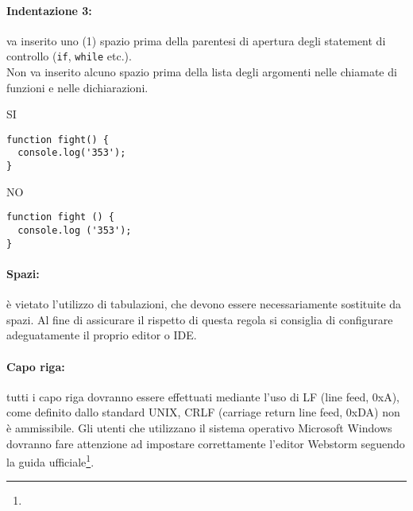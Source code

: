 \documentclass[../ProcessiPrimari.tex]{subfiles}
\begin{document}
\paragraph*{Indentazione 3: }
va inserito uno (1) spazio prima della parentesi di apertura degli statement di controllo (\texttt{if}, \texttt{while} etc.). \\
Non va inserito alcuno spazio prima della lista degli argomenti nelle chiamate di funzioni e nelle dichiarazioni.\\

\begin{center}{
\begin{minipage}{5cm}
{\begin{center}SI\end{center}}
\begin{Verbatim}[frame=single]
function fight() {
  console.log('353');
}
\end{Verbatim}
\end{minipage}
\hfil
\begin{minipage}{5cm}
{\begin{center}NO\end{center}}
\begin{Verbatim}[frame=single]
function fight () {
  console.log ('353');
}
\end{Verbatim}
\end{minipage}
}
\end{center}


\paragraph*{Spazi: }
è vietato l'utilizzo di tabulazioni, che devono essere necessariamente sostituite da spazi. Al fine di assicurare il rispetto di questa regola si consiglia di configurare adeguatamente il proprio editor o IDE.

\paragraph*{Capo riga: }
tutti i capo riga dovranno essere effettuati mediante l'uso di LF (line feed, 0xA), come definito dallo standard UNIX, CRLF (carriage return line feed, 0xDA) non è ammissibile. Gli utenti che utilizzano il sistema operativo Microsoft Windows dovranno fare attenzione ad impostare correttamente l'editor Webstorm seguendo la guida ufficiale\footnote{}.
\end{document}
